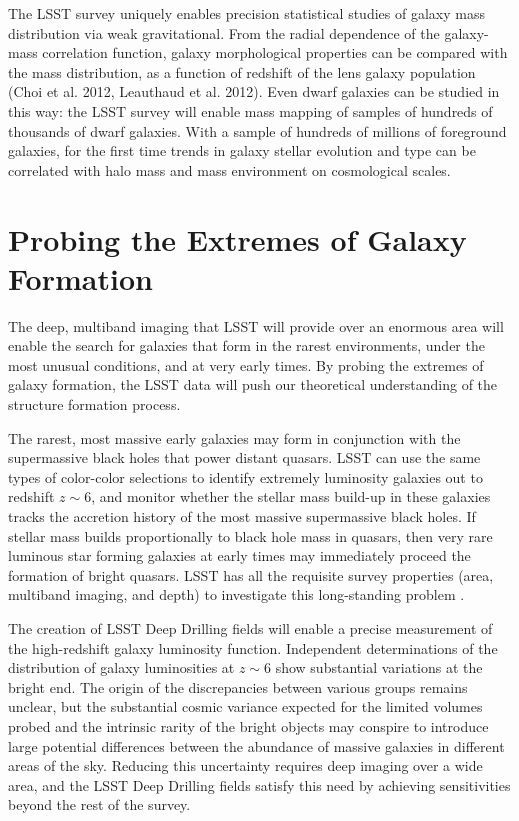 {The LSST survey uniquely enables precision statistical studies of 
galaxy mass
distribution via weak gravitational.
From the radial dependence of
the galaxy-mass correlation function, galaxy morphological properties 
can be compared with the mass distribution, as a function
of redshift of the lens galaxy population (Choi et al. 2012,
Leauthaud et al. 2012).  Even dwarf galaxies 
can be studied in this way: the LSST survey will enable mass
mapping of samples of hundreds of thousands of dwarf galaxies.
With a sample of hundreds of millions of foreground galaxies, 
for the first time trends in galaxy stellar evolution and type 
can be correlated with halo mass and mass environment on cosmological scales.

\section{Probing the Extremes of Galaxy Formation}
\label{sec:sci:gal:bkgnd:rare}

The deep, multiband imaging that LSST will provide over an enormous
area will enable the search for galaxies that form in the
rarest environments, under the most unusual conditions,
and at very early times. By probing the extremes of
galaxy formation, the LSST data will push our theoretical
understanding of the structure formation process.

The rarest, most massive early galaxies may form in 
conjunction with the supermassive black holes that
power distant quasars. LSST can use the same
types of color-color selections to identify extremely
luminosity galaxies out to redshift $z\sim6$, and
monitor whether the stellar mass build-up in these
galaxies tracks the accretion history of the most
massive supermassive black holes. If stellar mass
builds proportionally to black hole mass in quasars,
then very rare luminous star forming galaxies at
early times may immediately proceed the formation
of bright quasars. LSST has all the requisite
survey properties (area, multiband imaging, and
depth) to investigate this long-standing problem \citep{robertson2007a}.

The creation of LSST Deep Drilling fields will
enable a precise measurement of the
high-redshift galaxy luminosity function.
Independent determinations of the distribution of 
galaxy luminosities at $z\sim6$ show substantial
variations at the bright end. The origin of
the discrepancies between various groups remains
unclear, but the substantial cosmic variance expected
for the limited volumes probed and the intrinsic
rarity of the bright objects may conspire to
introduce large potential differences between
the abundance of massive galaxies in different
areas of the sky. Reducing this uncertainty requires
deep imaging over a wide area, and the LSST Deep Drilling
fields satisfy this need by achieving sensitivities
beyond the rest of the survey. 

}
